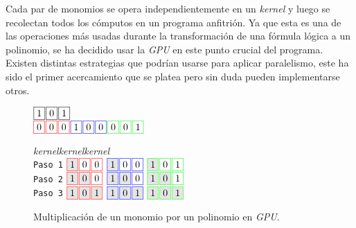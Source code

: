 Cada par de monomios se opera independientemente en un \textit{kernel} y luego se recolectan todos los cómputos en un programa anfitrión. Ya que esta es una de las operaciones más usadas durante la transformación de una fórmula lógica a un polinomio, se ha decidido usar la \textit{GPU} en este punto crucial del programa. Existen distintas estrategias que podrían usarse para aplicar paralelismo, este ha sido el primer acercamiento que se platea pero sin duda pueden implementarse otros.

\begin{figure}
    \centering
    \begin{minipage}[c][4.2cm][b]{.58\textwidth}
    \noindent
    $\fbox{1} \hspace*{.1em} \fbox{0} \hspace*{.1em} \fbox{1}$\\
    \noindent
    $\fcolorbox{red}{white}{0} \sep \fcolorbox{red}{white}{0} \sep \fcolorbox{red}{white}{0} \sep \fcolorbox{blue}{white}{1} \sep \fcolorbox{blue}{white}{0} \sep \fcolorbox{blue}{white}{0} \sep \fcolorbox{green}{white}{0} \sep \fcolorbox{green}{white}{0} \sep \fcolorbox{green}{white}{1}$\\

    \vspace{1em}

    \noindent\hspace{3.6em}\textit{kernel}\hspace{3.4em}\textit{kernel}\hspace{3.4em}\textit{kernel}\\
    \centering
    \texttt{Paso 1}
    $\fcolorbox{red}{gray!20}{1} \sep \fcolorbox{red}{white}{0} \sep \fcolorbox{red}{white}{0}$ \hspace{2em} $\fcolorbox{blue}{gray!20}{1} \sep \fcolorbox{blue}{white}{0} \sep \fcolorbox{blue}{white}{0}$ \hspace{2em} $\fcolorbox{green}{gray!20}{1} \sep \fcolorbox{green}{white}{0} \sep \fcolorbox{green}{white}{1}$\\

    \texttt{Paso 2}
    $\fcolorbox{red}{gray!20}{1} \sep \fcolorbox{red}{gray!20}{0} \sep \fcolorbox{red}{white}{0}$ \hspace{2em} $\fcolorbox{blue}{gray!20}{1} \sep \fcolorbox{blue}{gray!20}{0} \sep \fcolorbox{blue}{white}{0}$ \hspace{2em} $\fcolorbox{green}{gray!20}{1} \sep \fcolorbox{green}{gray!20}{0} \sep \fcolorbox{green}{white}{1}$\\

    \texttt{Paso 3}
    $\fcolorbox{red}{gray!20}{1} \sep \fcolorbox{red}{gray!20}{0} \sep \fcolorbox{red}{gray!20}{1}$ \hspace{2em} $\fcolorbox{blue}{gray!20}{1} \sep \fcolorbox{blue}{gray!20}{0} \sep \fcolorbox{blue}{gray!20}{1}$ \hspace{2em} $\fcolorbox{green}{gray!20}{1} \sep \fcolorbox{green}{gray!20}{0} \sep \fcolorbox{green}{gray!20}{1}$
    \end{minipage}
\caption{Multiplicación de un monomio por un polinomio en \textit{GPU}.}
\label{fig:map_gpu_kernels}
\end{figure}

